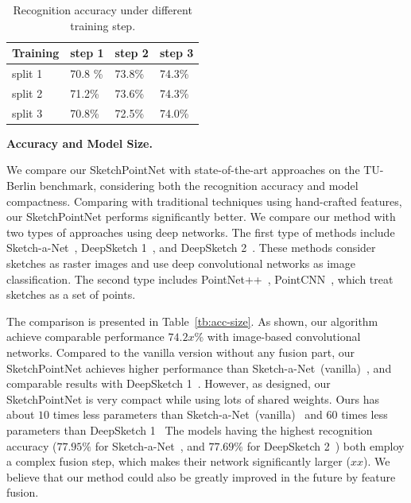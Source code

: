 \begin{table}[htbp]
\centering
\caption{Recognition accuracy under different training step.}
\label{tbl:iteration}
\begin{tabular}{l|lll}
    \hline
     Training& step 1&  step 2& step 3\\
    \hline
     split 1& 70.8 \% & 73.8\% & 74.3\% \\
     split 2& 71.2\% & 73.6\% & 74.3\% \\
     split 3& 70.8\% & 72.5\% & 74.0\% \\
    \hline
\end{tabular}
\end{table}



\noindent\textbf{Accuracy and Model Size.}
\label{ssec:cm_speed}

We compare our SketchPointNet with state-of-the-art approaches on the TU-Berlin benchmark, considering both the recognition accuracy and model compactness.
%
Comparing with traditional techniques using hand-crafted features, our SketchPointNet performs significantly better.
%
We compare our method with two types of approaches using deep networks.
The first type of methods include Sketch-a-Net~\cite{Yu2015SketchaNetTB}, DeepSketch 1~\cite{Seddati2015DeepSketchDC}, and DeepSketch 2~\cite{Dupont2016DeepSketch2D}.
These methods consider sketches as raster images and use deep convolutional networks as image classification. 
The second type includes PointNet++~\cite{qi2017pointnetplusplus}, PointCNN~\cite{1801.07791}, which treat sketches as a set of points. 


The comparison is presented in Table~\ref{tb:acc-size}. 
As shown, our algorithm achieve comparable performance $74.2x\%$ with image-based convolutional networks. 
%
Compared to the vanilla version without any fusion part, our SketchPointNet achieves higher performance than Sketch-a-Net~(vanilla)~\cite{Yu2015SketchaNetTB}, and comparable results with DeepSketch 1~\cite{Seddati2015DeepSketchDC}.
However, as designed, our SketchPointNet is very compact while using lots of shared weights. 
Ours has about $10$ times less parameters than Sketch-a-Net~(vanilla)~\cite{Yu2015SketchaNetTB} and $60$ times less parameters than DeepSketch 1~\cite{Seddati2015DeepSketchDC}
%
The models having the highest recognition accuracy ($77.95\%$ for Sketch-a-Net~\cite{Yu2015SketchaNetTB}, and $77.69\%$ for DeepSketch 2~\cite{Dupont2016DeepSketch2D}) both employ a complex fusion step, which makes their network significantly larger ($xx$).
%
We believe that our method could also be greatly improved in the future by feature fusion. 


